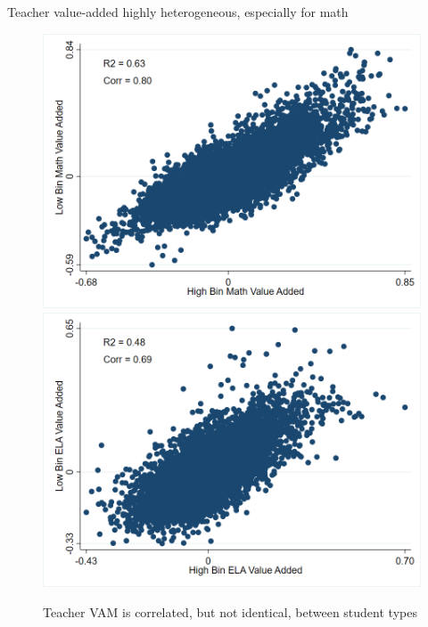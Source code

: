 \documentclass[t,aspectratio=169,11pt]{beamer}
\begin{document}





\begin{frame}[c]{Teacher value-added highly heterogeneous, especially for math}

    \vfill
    \begin{figure}[H]
        \centering
         \includegraphics[width=.45\textwidth]{Working_Paper/WP_Figures/Math_High_Bin_Versus_Low_Bin.png}
          \includegraphics[width=.45\textwidth]{Working_Paper/WP_Figures/ELA_High_Bin_Versus_Low_Bin.png}
       
            \caption*{Teacher VAM is correlated, but not identical, between student types}
            \label{fig:t_tests}
    \end{figure}
    \vfill

\end{frame}
\end{document}
